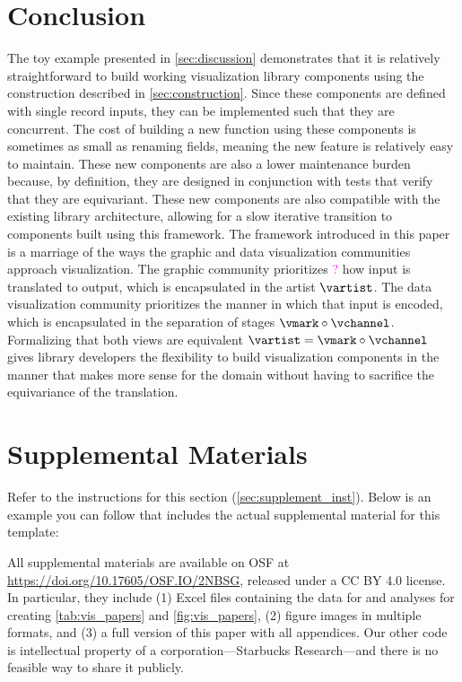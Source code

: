 \documentclass[review]{vgtc}
\newcommand{\note}[1]{\textcolor{magenta}{#1}}
\theoremstyle{definition}
\theoremstyle{remark}
\begin{document}
\section{Conclusion}
The toy example presented in \autoref{sec:discussion} demonstrates that it is relatively straightforward to build working visualization library components using the construction described in \autoref{sec:construction}. Since these components are defined with single record inputs, they can be implemented such that they are concurrent. The cost of building a new function using these components is sometimes as small as renaming fields, meaning the new feature is relatively easy to maintain. These new components are also a lower maintenance burden because, by definition, they are designed in conjunction with tests that verify that they are equivariant.
These new components are also compatible with the existing library architecture, allowing for a slow iterative transition to components built using this framework.
The framework introduced in this paper is a marriage of the ways the graphic and data visualization communities approach visualization. The graphic community prioritizes \note{?} how input is translated to output, which is encapsulated in the artist $\vartist$. The data visualization community prioritizes the manner in which that input is encoded, which is encapsulated in the separation of stages $\vmark \circ \vchannel$. Formalizing that both views are equivalent $\vartist=\vmark \circ \vchannel$ gives library developers the flexibility to build visualization components in the manner that makes more sense for the domain without having to sacrifice the equivariance of the translation.

\section*{Supplemental Materials}
\label{sec:supplemental_materials}

Refer to the instructions for this section (\cref{sec:supplement_inst}).
Below is an example you can follow that includes the actual supplemental material for this template:

All supplemental materials are available on OSF at \url{https://doi.org/10.17605/OSF.IO/2NBSG}, released under a CC BY 4.0 license.
In particular, they include (1) Excel files containing the data for and analyses for creating \cref{tab:vis_papers} and \cref{fig:vis_papers}, (2) figure images in multiple formats, and (3) a full version of this paper with all appendices.
Our other code is intellectual property of a corporation---Starbucks Research---and there is no feasible way to share it publicly.
\end{document}
